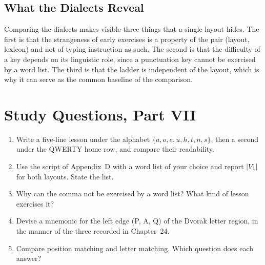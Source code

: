 \section{What the Dialects Reveal}

Comparing the dialects makes visible three things that a single layout hides. The first is that the strangeness of early exercises is a property of the pair (layout, lexicon) and not of typing instruction as such. The second is that the difficulty of a key depends on its linguistic role, since a punctuation key cannot be exercised by a word list. The third is that the ladder is independent of the layout, which is why it can serve as the common baseline of the comparison.

\chapter*{Study Questions, Part VII}
\begin{enumerate}
\item Write a five-line lesson under the alphabet $\{a,o,e,u,h,t,n,s\}$, then a second under the QWERTY home row, and compare their readability.
\item Use the script of Appendix~D with a word list of your choice and report $|V_1|$ for both layouts. State the list.
\item Why can the comma not be exercised by a word list? What kind of lesson exercises it?
\item Devise a mnemonic for the left edge (P, A, Q) of the Dvorak letter region, in the manner of the three recorded in Chapter~24.
\item Compare position matching and letter matching. Which question does each answer?
\end{enumerate}
